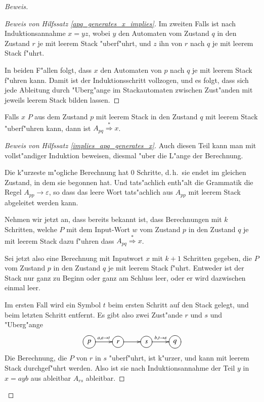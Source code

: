 \begin{proof}[Beweis]
\begin{proof}[Beweis von Hilfssatz \ref{apq_generates_x_implies}]
Im zweiten Falls ist nach Induktionsannahme $x=yz$, wobei $y$ den
Automaten vom Zustand $q$ in den Zustand $r$ je mit leerem Stack
"uberf"uhrt, und $z$ ihn von $r$ nach $q$ je mit leerem Stack
f"uhrt.

In beiden F"allen folgt, dass $x$ den Automaten von $p$
nach $q$ je mit leerem Stack f"uhren kann.
Damit ist der Induktionsschritt vollzogen, und es folgt, dass
sich jede Ableitung durch "Uberg"ange im Stackautomaten zwischen
Zust"anden mit jeweils leerem Stack bilden lassen.
\end{proof}

\begin{hilfssatz}\label{implies_apq_generates_x}
Falls $x$ $P$ aus dem Zustand $p$ mit leerem Stack in den Zustand
$q$ mit leerem Stack "uberf"uhren kann, dann ist
$A_{pq}\overset{*}{\Rightarrow} x$.
\end{hilfssatz}

\begin{proof}[Beweis von Hilfssatz \ref{implies_apq_generates_x}]
Auch diesen Teil kann man mit vollst"andiger Induktion beweisen,
diesmal "uber die L"ange der Berechnung. 

Die k"urzeste m"ogliche Berechnung hat $0$ Schritte, d.\,h.~sie endet
im gleichen Zustand, in dem sie begonnen hat.
Und tats"achlich enth"alt die Grammatik die Regel $A_{pp}\to\varepsilon$, 
so dass das leere Wort tats"achlich aus $A_{pp}$ mit leerem
Stack abgeleitet werden kann.

Nehmen wir jetzt an, dass bereits bekannt ist, dass Berechnungen mit
$k$ Schritten, welche $P$ mit dem Input-Wort $w$ vom Zustand $p$
in den Zustand $q$ je mit leerem Stack dazu f"uhren dass
$A_{pq}\overset{*}{\Rightarrow} x$.

Sei jetzt also eine Berechnung mit Inputwort $x$
mit $k+1$ Schritten gegeben, die $P$ vom Zustand $p$ in den Zustand $q$ 
je mit leerem Stack f"uhrt. Entweder ist der Stack nur ganz zu
Beginn oder ganz am Schluss leer, oder er wird dazwischen einmal
leer.

Im ersten Fall wird ein Symbol $t$ beim ersten Schritt auf den Stack
gelegt, und beim letzten Schritt entfernt. Es gibt also zwei Zust"ande
$r$ und $s$ und "Uberg"ange
\[
\entrymodifiers={++[o][F]}
\xymatrix{
p\ar[r]^{a,\varepsilon\to t}
	&r\ar[r]
		&s\ar[r]^{b,t\to\varepsilon}
			&q
}
\]
Die Berechnung, die $P$ von $r$ in $s$ "uberf"uhrt, ist k"urzer, und kann
mit leerem Stack durchgef"uhrt werden.
Also ist sie nach Induktionsannahme der Teil $y$ in $x=ayb$ aus ableitbar 
$A_{rs}$ ableitbar.


\end{proof}
\end{proof}
